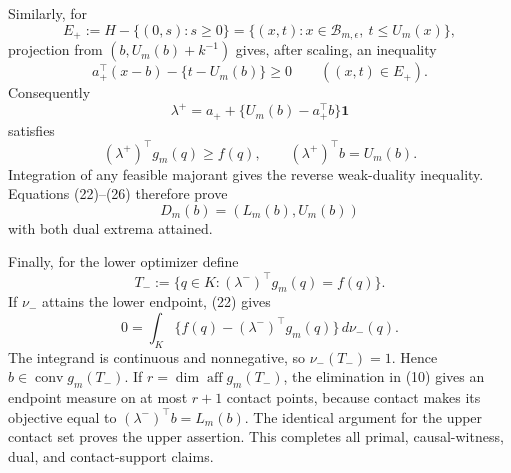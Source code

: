 Similarly, for
\[
 E_+:=H-\{(0,s):s\geq0\}
 =\{(x,t):x\in\mathcal B_{m,\epsilon},\ t\leq U_m(x)\},
\]
projection from \((b,U_m(b)+k^{-1})\) gives, after scaling, an inequality
\[
 a_+^{\top}(x-b)-\{t-U_m(b)\}\geq0\qquad((x,t)\in E_+).
\tag{24}
\]
Consequently
\[
 \lambda^+=a_++\{U_m(b)-a_+^{\top}b\}\mathbf 1
\tag{25}
\]
satisfies
\[
 (\lambda^+)^{\top}g_m(q)\geq f(q),
 \qquad (\lambda^+)^{\top}b=U_m(b).
\tag{26}
\]
Integration of any feasible majorant gives the reverse weak-duality inequality.  Equations (22)--(26) therefore prove
\[
 D_m(b)=(L_m(b),U_m(b))
\tag{27}
\]
with both dual extrema attained.

Finally, for the lower optimizer define
\[
 T_-:=\{q\in K:(\lambda^-)^{\top}g_m(q)=f(q)\}.
\]
If \(\nu_-\) attains the lower endpoint, (22) gives
\[
 0=\int_K\{f(q)-(\lambda^-)^{\top}g_m(q)\}\,d\nu_-(q).
\tag{28}
\]
The integrand is continuous and nonnegative, so \(\nu_-(T_-)=1\).  Hence \(b\in\operatorname{conv}g_m(T_-)\).  If \(r=\dim\operatorname{aff}g_m(T_-)\), the elimination in (10) gives an endpoint measure on at most \(r+1\) contact points, because contact makes its objective equal to \((\lambda^-)^{\top}b=L_m(b)\).  The identical argument for the upper contact set proves the upper assertion.  This completes all primal, causal-witness, dual, and contact-support claims.